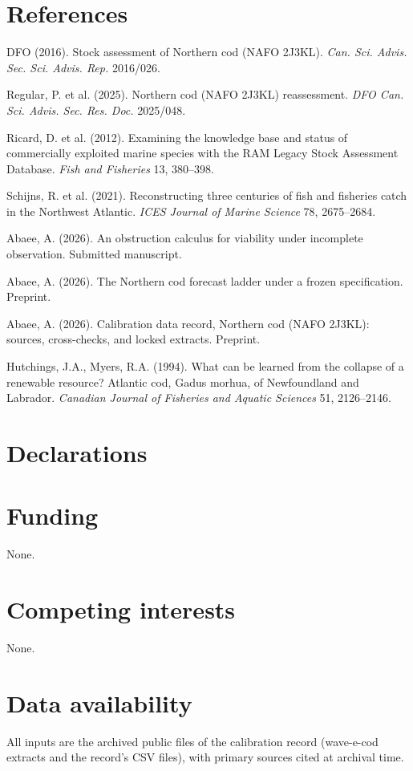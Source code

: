 \documentclass[10pt,twocolumn]{article}
\theoremstyle{plain}
\theoremstyle{remark}
\begin{document}
\section*{References}

{\footnotesize
DFO (2016). Stock assessment of Northern cod (NAFO 2J3KL). \emph{Can.
Sci. Advis. Sec. Sci. Advis. Rep.} 2016/026.

Regular, P. et al. (2025). Northern cod (NAFO 2J3KL) reassessment.
\emph{DFO Can. Sci. Advis. Sec. Res. Doc.} 2025/048.

Ricard, D. et al. (2012). Examining the knowledge base and status of
commercially exploited marine species with the RAM Legacy Stock
Assessment Database. \emph{Fish and Fisheries} 13, 380--398.

Schijns, R. et al. (2021). Reconstructing three centuries of fish and
fisheries catch in the Northwest Atlantic. \emph{ICES Journal of Marine
Science} 78, 2675--2684.

Abaee, A. (2026). An obstruction calculus for viability under
incomplete observation. Submitted manuscript.

Abaee, A. (2026). The Northern cod forecast ladder under a frozen
specification. Preprint.

Abaee, A. (2026). Calibration data record, Northern cod (NAFO 2J3KL):
sources, cross-checks, and locked extracts. Preprint.

Hutchings, J.A., Myers, R.A. (1994). What can be learned from the
collapse of a renewable resource? Atlantic cod, Gadus morhua, of
Newfoundland and Labrador. \emph{Canadian Journal of Fisheries and
Aquatic Sciences} 51, 2126--2146.
}

\section*{Declarations}

\section*{Funding}
None.

\section*{Competing interests}
None.

\section*{Data availability}
All inputs are the archived public files of the calibration record
(wave-e-cod extracts and the record's CSV files), with primary sources
cited at archival time.
\end{document}
